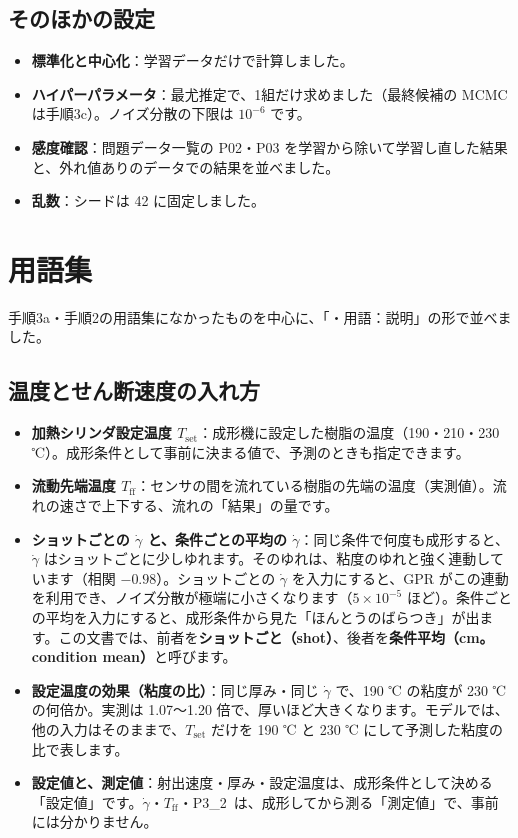 \documentclass[paper=a4paper,fontsize=10.5pt,line_length=44zw,number_of_lines=38]{jlreq}
\newcommand{\gd}{\dot{\gamma}}
\newcommand{\PII}{P3\_2}
\newcommand{\Tff}{T_{\mathrm{ff}}}
\newcommand{\Tset}{T_{\mathrm{set}}}
\newenvironment{termlist}{\begin{itemize}[label=・,leftmargin=1\zw,labelwidth=1\zw,labelsep=0pt,itemsep=0.4ex,topsep=0.6ex,parsep=0pt]}{\end{itemize}}
\newcommand{\term}[1]{\item \textbf{#1}：}
\newenvironment{points}{\begin{itemize}[label=$\triangleright$,leftmargin=1.5\zw,itemsep=0.3ex,topsep=0.5ex,parsep=0pt]}{\end{itemize}}
\newcommand{\pt}[1]{\item \textbf{#1}：}
\begin{document}
\subsection{そのほかの設定}
\begin{points}
\pt{標準化と中心化}学習データだけで計算しました。
\pt{ハイパーパラメータ}最尤推定で、1組だけ求めました（最終候補の MCMC は手順3c）。ノイズ分散の下限は $10^{-6}$ です。
\pt{感度確認}問題データ一覧の P02・P03 を学習から除いて学習し直した結果と、外れ値ありのデータでの結果を並べました。
\pt{乱数}シードは 42 に固定しました。
\end{points}

\section{用語集}

手順3a・手順2の用語集になかったものを中心に、「・用語：説明」の形で並べました。

\subsection{温度とせん断速度の入れ方}
\begin{termlist}
\term{加熱シリンダ設定温度 $\Tset$}成形機に設定した樹脂の温度（190・210・230 ℃）。成形条件として事前に決まる値で、予測のときも指定できます。
\term{流動先端温度 $\Tff$}センサの間を流れている樹脂の先端の温度（実測値）。流れの速さで上下する、流れの「結果」の量です。
\term{ショットごとの $\gd$ と、条件ごとの平均の $\gd$}同じ条件で何度も成形すると、$\gd$ はショットごとに少しゆれます。そのゆれは、粘度のゆれと強く連動しています（相関 $-0.98$）。ショットごとの $\gd$ を入力にすると、GPR がこの連動を利用でき、ノイズ分散が極端に小さくなります（$5\times10^{-5}$ ほど）。条件ごとの平均を入力にすると、成形条件から見た「ほんとうのばらつき」が出ます。この文書では、前者を\textbf{ショットごと（shot）}、後者を\textbf{条件平均（cm。condition mean）}と呼びます。
\term{設定温度の効果（粘度の比）}同じ厚み・同じ $\gd$ で、190 ℃ の粘度が 230 ℃ の何倍か。実測は 1.07〜1.20 倍で、厚いほど大きくなります。モデルでは、他の入力はそのままで、$\Tset$ だけを 190 ℃ と 230 ℃ にして予測した粘度の比で表します。
\term{設定値と、測定値}射出速度・厚み・設定温度は、成形条件として決める「設定値」です。$\gd$・$\Tff$・\PII\ は、成形してから測る「測定値」で、事前には分かりません。
\end{termlist}
\end{document}
